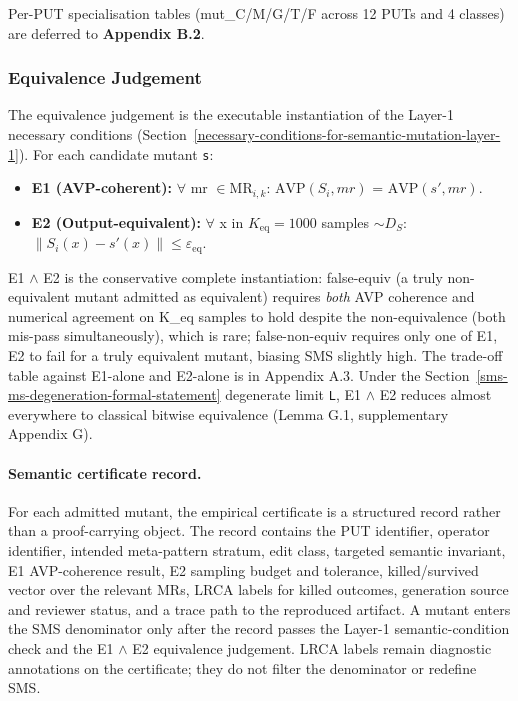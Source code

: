 \documentclass[manuscript,screen,review]{acmart}
\begin{document}
Per-PUT specialisation tables (mut\_C/M/G/T/F across 12 PUTs and 4
classes) are deferred to \textbf{Appendix B.2}.

\subsubsection{Equivalence Judgement}\label{equivalence-judgement-e1-e2-layer-2}

The equivalence judgement is the executable instantiation of the Layer-1
necessary conditions (Section~\ref{necessary-conditions-for-semantic-mutation-layer-1}). For each candidate mutant
\texttt{s\textquotesingle{}}:

\begin{itemize}

\item
  \textbf{E1 (AVP-coherent):} $\forall$ mr $\in \mathrm{MR}_{i,k}$: $\mathrm{AVP}(S_i, mr)$ =
  $\mathrm{AVP}(s', mr)$.
\item
  \textbf{E2 (Output-equivalent):} $\forall$ x in $K_{\mathrm{eq}}=1000$ samples
  $\sim D_S$: $\|S_i(x) - s'(x)\| \leq \varepsilon_{\mathrm{eq}}$.
\end{itemize}

E1 $\wedge$ E2 is the conservative complete instantiation: false-equiv (a
truly non-equivalent mutant admitted as equivalent) requires \emph{both}
AVP coherence and numerical agreement on K\_eq samples to hold despite the
non-equivalence (both mis-pass simultaneously), which is rare;
false-non-equiv requires only one of E1, E2 to fail for a truly equivalent
mutant, biasing SMS slightly high. The trade-off table against
E1-alone and E2-alone is in Appendix A.3. Under the Section~\ref{sms-ms-degeneration-formal-statement} degenerate
limit \texttt{L}, E1 $\wedge$ E2 reduces almost everywhere to classical bitwise
equivalence (Lemma G.1, supplementary Appendix G).

\paragraph{Semantic certificate record.}
For each admitted mutant, the empirical certificate is a structured
record rather than a proof-carrying object. The record contains the PUT
identifier, operator identifier, intended meta-pattern stratum, edit
class, targeted semantic invariant, E1 AVP-coherence result, E2 sampling
budget and tolerance, killed/survived vector over the relevant MRs, LRCA
labels for killed outcomes, generation source and reviewer status, and a
trace path to the reproduced artifact. A mutant enters the SMS
denominator only after the record passes the Layer-1 semantic-condition
check and the E1 $\wedge$ E2 equivalence judgement. LRCA labels remain
diagnostic annotations on the certificate; they do not filter the
denominator or redefine SMS.
\end{document}
